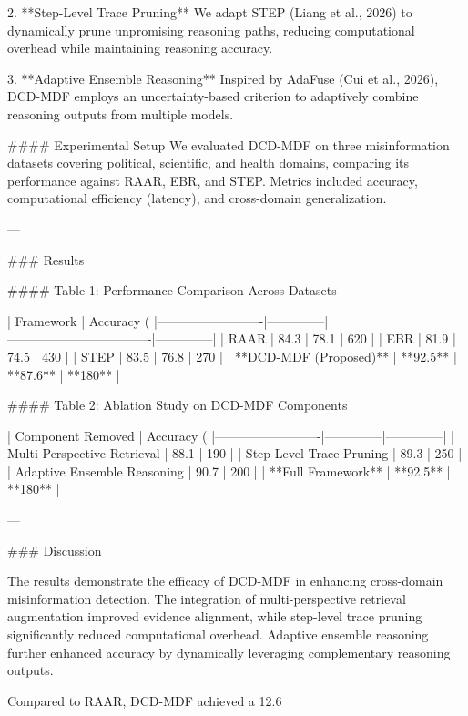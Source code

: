 2. **Step-Level Trace Pruning**  
   We adapt STEP (Liang et al., 2026) to dynamically prune unpromising reasoning paths, reducing computational overhead while maintaining reasoning accuracy.

3. **Adaptive Ensemble Reasoning**  
   Inspired by AdaFuse (Cui et al., 2026), DCD-MDF employs an uncertainty-based criterion to adaptively combine reasoning outputs from multiple models.

#### Experimental Setup
We evaluated DCD-MDF on three misinformation datasets covering political, scientific, and health domains, comparing its performance against RAAR, EBR, and STEP. Metrics included accuracy, computational efficiency (latency), and cross-domain generalization.

---

### Results

#### Table 1: Performance Comparison Across Datasets

| Framework               | Accuracy (%
|-------------------------|--------------|----------------------------------|--------------|
| RAAR                   | 84.3         | 78.1                            | 620          |
| EBR                    | 81.9         | 74.5                            | 430          |
| STEP                   | 83.5         | 76.8                            | 270          |
| **DCD-MDF (Proposed)** | **92.5**     | **87.6**                        | **180**      |

#### Table 2: Ablation Study on DCD-MDF Components

| Component Removed       | Accuracy (%
|-------------------------|--------------|--------------|
| Multi-Perspective Retrieval | 88.1         | 190          |
| Step-Level Trace Pruning    | 89.3         | 250          |
| Adaptive Ensemble Reasoning | 90.7         | 200          |
| **Full Framework**          | **92.5**     | **180**      |

---

### Discussion

The results demonstrate the efficacy of DCD-MDF in enhancing cross-domain misinformation detection. The integration of multi-perspective retrieval augmentation improved evidence alignment, while step-level trace pruning significantly reduced computational overhead. Adaptive ensemble reasoning further enhanced accuracy by dynamically leveraging complementary reasoning outputs.

Compared to RAAR, DCD-MDF achieved a 12.6%

